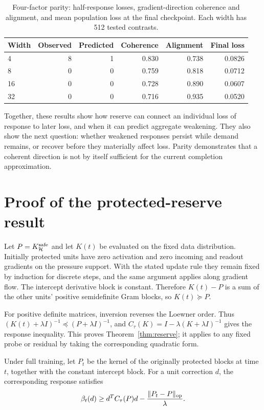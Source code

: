 \documentclass[11pt,a4paper]{article}
\begin{document}
\begin{table}[htbp]
\centering
\caption{Four-factor parity: half-response losses, gradient-direction coherence and alignment, and mean population loss at the final checkpoint. Each width has 512 tested contrasts.}
\label{tab:parity}
\begin{tabular}{@{}lrrrrr@{}}
\toprule
Width & Observed & Predicted & Coherence & Alignment & Final loss \\
\midrule
4  & 8 & 1 & 0.830 & 0.738 & 0.0826 \\
8  & 0 & 0 & 0.759 & 0.818 & 0.0712 \\
16 & 0 & 0 & 0.728 & 0.890 & 0.0607 \\
32 & 0 & 0 & 0.716 & 0.935 & 0.0520 \\
\bottomrule
\end{tabular}
\end{table}

Together, these results show how reserve can connect an individual loss of response to later loss, and when it can predict aggregate weakening. They also show the next question: whether weakened responses persist while demand remains, or recover before they materially affect loss. Parity demonstrates that a coherent direction is not by itself sufficient for the current completion approximation.

\clearpage
\appendix
\section{Proof of the protected-reserve result}\label{app:reserve}
Let $P=K_{\mathcal H}^{\rm safe}$ and let $K(t)$ be evaluated on the fixed data distribution. Initially protected units have zero activation and zero incoming and readout gradients on the pressure support. With the stated update rule they remain fixed by induction for discrete steps, and the same argument applies along gradient flow. The intercept derivative block is constant. Therefore $K(t)-P$ is a sum of the other units' positive semidefinite Gram blocks, so $K(t)\succeq P$.

For positive definite matrices, inversion reverses the Loewner order. Thus $(K(t)+\lambda I)^{-1}\preceq(P+\lambda I)^{-1}$, and $C_\tau(K)=I-\lambda(K+\lambda I)^{-1}$ gives the response inequality. This proves Theorem~\ref{thm:reserve}; it applies to any fixed probe or residual by taking the corresponding quadratic form.

Under full training, let $P_t$ be the kernel of the originally protected blocks at time $t$, together with the constant intercept block. For a unit correction $d$, the corresponding response satisfies
\begin{equation}
 \beta_t(d)\ge d^TC_\tau(P)d-\frac{\|P_t-P\|_{\rm op}}{\lambda}.
 \label{eq:perturb}
\end{equation}
\end{document}
